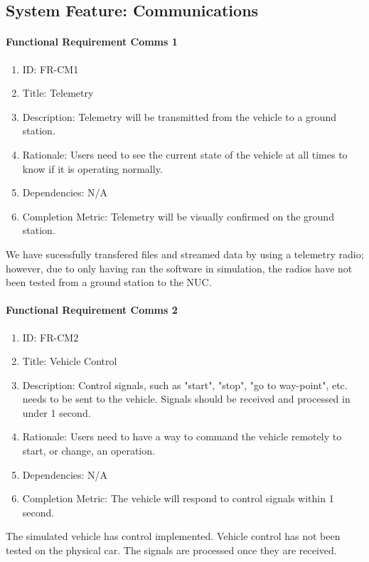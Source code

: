 \documentclass[compsoc,draftclsnofoot,onecolumn,10pt]{IEEEtran}
\begin{document}
\subsection{System Feature: Communications}

	\paragraph{\textbf{Functional Requirement Comms 1}}
		\begin{enumerate}
			\item ID: FR-CM1
			\item Title: Telemetry
			\item Description: Telemetry will be transmitted from the vehicle to a ground station.
			\item Rationale: Users need to see the current state of the vehicle at all times to know if it is operating normally.
			\item Dependencies: N/A
			\item Completion Metric: Telemetry will be visually confirmed on the ground station.
		\end{enumerate}
    We have sucessfully transfered files and streamed data by using a telemetry radio; however, due to only having ran the software in simulation, the radios have not been tested from a ground station to the NUC.
    
	\paragraph{\textbf{Functional Requirement Comms 2}}
		\begin{enumerate}
			\item ID: FR-CM2
			\item Title: Vehicle Control
			\item Description: Control signals, such as "start", "stop", "go to way-point", etc. needs to be sent to the vehicle. Signals should be received and processed in under 1 second.
			\item Rationale: Users need to have a way to command the vehicle remotely to start, or change, an operation.
			\item Dependencies: N/A
			\item Completion Metric: The vehicle will respond to control signals within 1 second.
		\end{enumerate}
	The simulated vehicle has control implemented. Vehicle control has not been tested on the physical car. The signals are processed once they are received.
	
\end{document}
